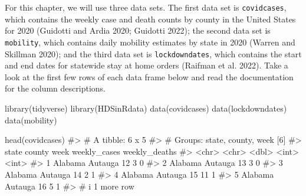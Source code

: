 \documentclass[
  letterpaper,
]{krantz}
\makeatletter
\newenvironment{Shaded}{\begin{snugshade}}{\end{snugshade}}
\newcommand{\CommentTok}[1]{\textcolor[rgb]{0.37,0.37,0.37}{#1}}
\newcommand{\FunctionTok}[1]{\textcolor[rgb]{0.28,0.35,0.67}{#1}}
\newcommand{\NormalTok}[1]{\textcolor[rgb]{0.00,0.23,0.31}{#1}}
\newenvironment{kframe}{%
\medskip{}
\setlength{\fboxsep}{.8em}
 \def\at@end@of@kframe{}%
 \ifinner\ifhmode%
  \def\at@end@of@kframe{\end{minipage}}%
  \begin{minipage}{\columnwidth}%
 \fi\fi%
 \def\FrameCommand##1{\hskip\@totalleftmargin \hskip-\fboxsep
 \colorbox{shadecolor}{##1}\hskip-\fboxsep
     \hskip-\linewidth \hskip-\@totalleftmargin \hskip\columnwidth}%
 \MakeFramed {\advance\hsize-\width
   \@totalleftmargin\z@ \linewidth\hsize
   \@setminipage}}%
 {\par\unskip\endMakeFramed%
 \at@end@of@kframe}
\renewenvironment{Shaded}{\begin{kframe}}{\end{kframe}}
\makeatother
\begin{document}
For this chapter, we will use three data sets. The first data set is
\texttt{covidcases}, which contains the weekly case and death counts by
county in the United States for 2020 (Guidotti and Ardia 2020; Guidotti
2022); the second data set is \texttt{mobility}, which contains daily
mobility estimates by state in 2020 (Warren and Skillman 2020); and the
third data set is \texttt{lockdowndates}, which contains the start and
end dates for statewide stay at home orders (Raifman et al. 2022). Take
a look at the first few rows of each data frame below and read the
documentation for the column descriptions.

\begin{Shaded}
\begin{Highlighting}[]
\FunctionTok{library}\NormalTok{(tidyverse)}
\FunctionTok{library}\NormalTok{(HDSinRdata)}
\FunctionTok{data}\NormalTok{(covidcases)}
\FunctionTok{data}\NormalTok{(lockdowndates)}
\FunctionTok{data}\NormalTok{(mobility)}
\end{Highlighting}
\end{Shaded}

\begin{Shaded}
\begin{Highlighting}[]
\FunctionTok{head}\NormalTok{(covidcases)}
\CommentTok{\#\textgreater{} \# A tibble: 6 x 5}
\CommentTok{\#\textgreater{} \# Groups:   state, county, week [6]}
\CommentTok{\#\textgreater{}   state   county   week weekly\_cases weekly\_deaths}
\CommentTok{\#\textgreater{}   \textless{}chr\textgreater{}   \textless{}chr\textgreater{}   \textless{}dbl\textgreater{}        \textless{}int\textgreater{}         \textless{}int\textgreater{}}
\CommentTok{\#\textgreater{} 1 Alabama Autauga    12            3             0}
\CommentTok{\#\textgreater{} 2 Alabama Autauga    13            3             0}
\CommentTok{\#\textgreater{} 3 Alabama Autauga    14            2             1}
\CommentTok{\#\textgreater{} 4 Alabama Autauga    15           11             1}
\CommentTok{\#\textgreater{} 5 Alabama Autauga    16            5             1}
\CommentTok{\#\textgreater{} \# i 1 more row}
\end{Highlighting}
\end{Shaded}
\end{document}
